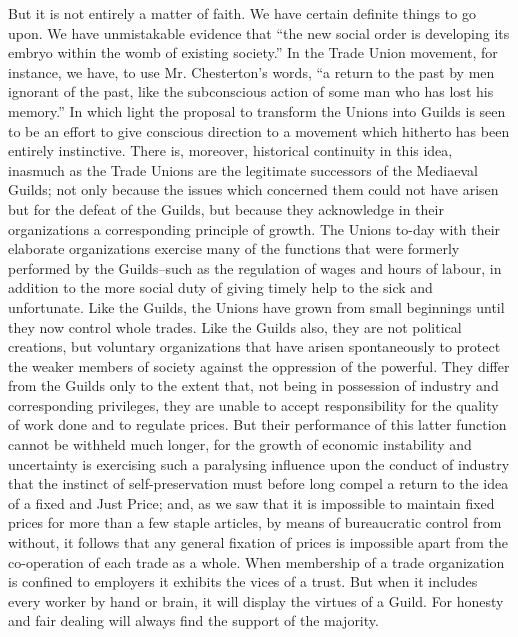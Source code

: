 \documentclass{book}
\begin{document}
But it is not entirely a matter of faith. We have certain definite things to go upon. We have unmistakable evidence that “the new social order is developing its embryo within the womb of existing society.” In the Trade Union movement, for instance, we have, to use Mr. Chesterton’s words, “a return to the past by men ignorant of the past, like the subconscious action of some man who has lost his memory.” In which light the proposal to transform the Unions into Guilds is seen to be an effort to give conscious direction to a movement which hitherto has been entirely instinctive. There is, moreover, historical continuity in this idea, inasmuch as the Trade Unions are the legitimate successors of the Mediaeval Guilds; not only because the issues which concerned them could not have arisen but for the defeat of the Guilds, but because they acknowledge in their organizations a corresponding principle of growth. The Unions to-day with their elaborate organizations exercise many of the functions that were formerly performed by the Guilds–such as the regulation of wages and hours of labour, in addition to the more social duty of giving timely help to the sick and unfortunate. Like the Guilds, the Unions have grown from small beginnings until they now control whole trades. Like the Guilds also, they are not political creations, but voluntary organizations that have arisen spontaneously to protect the weaker members of society against the oppression of the powerful. They differ from the Guilds only to the extent that, not being in possession of industry and corresponding privileges, they are unable to accept responsibility for the quality of work done and to regulate prices. But their performance of this latter function cannot be withheld much longer, for the growth of economic instability and uncertainty is exercising such a paralysing influence upon the conduct of industry that the instinct of self-preservation must before long compel a return to the idea of a fixed and Just Price; and, as we saw that it is impossible to maintain fixed prices for more than a few staple articles, by means of bureaucratic control from without, it follows that any general fixation of prices is impossible apart from the co-operation of each trade as a whole. When membership of a trade organization is confined to employers it exhibits the vices of a trust. But when it includes every worker by hand or brain, it will display the virtues of a Guild. For honesty and fair dealing will always find the support of the majority.
\end{document}
